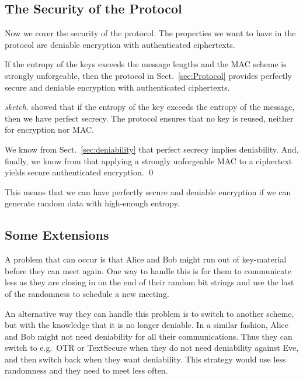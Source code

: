 \subsection{The Security of the Protocol}

Now we cover the security of the protocol.
The properties we want to have in the protocol are deniable encryption with 
authenticated ciphertexts.

\begin{theorem}
   If the entropy of the keys exceeds the message lengths and the \ac{MAC} 
   scheme is strongly unforgeable, then the protocol in 
   Sect.~\ref{sec:Protocol} provides perfectly secure and deniable encryption 
   with authenticated ciphertexts.
\end{theorem}
\begin{proof}[sketch]
  \citet{ShannonSecrecy} showed that if the entropy of the key exceeds the 
  entropy of the message, then we have perfect secrecy.
  The protocol ensures that no key is reused, neither for encryption nor 
  \ac{MAC}.

  We know from Sect.~\ref{sec:deniability} that perfect secrecy implies 
  deniability.
  And, finally, we know from \citet{AuthEncJournal} that applying a strongly 
  unforgeable \ac{MAC} to a ciphertext yields secure authenticated encryption.
  \qed{}
\end{proof}

This means that we can have perfectly secure and deniable encryption if we can 
generate random data with high-enough entropy.

\subsection{Some Extensions}

A problem that can occur is that Alice and Bob might run out of key-material 
before they can meet again.
One way to handle this is for them to communicate less as they are closing in 
on the end of their random bit strings and use the last of the randomness to 
schedule a new meeting.

An alternative way they can handle this problem is to switch to another scheme, 
but with the knowledge that it is no longer deniable.
In a similar fashion, Alice and Bob might not need deniability for all their 
communications.
Thus they can switch to e.g.~\ac{OTR} or TextSecure when they do not need 
deniability against Eve, and then switch back when they want deniability.
This strategy would use less randomness and they need to meet less often.

